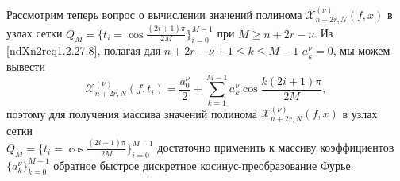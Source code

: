 Рассмотрим теперь вопрос о вычислении значений полинома $\mathcal{X}^{(\nu)}_{n+2r,N}(f,x)$ в узлах сетки $Q_M=\{t_i=\cos\frac{(2i+1)\pi}{2M}\}_{i=0}^{M-1}$ при  $M\ge n+2r-\nu$. Из \eqref{ndXn2req1.2.27.8}, полагая для $n+2r-\nu+1\le k\le M-1$  $a^\nu_k=0$,  мы можем вывести
\begin{equation}\label{ndXn2req1.2.27.17}
\mathcal{X}^{(\nu)}_{n+2r,N}(f,t_i)=\frac{a^\nu_0}{2}+\sum_{k=1}^{M-1}a^\nu_k\cos \frac{k(2i+1)\pi}{2M},
\end{equation}
поэтому для получения массива значений полинома  $\mathcal{X}^{(\nu)}_{n+2r,N}(f,x)$ в узлах сетки \\ $Q_M=\{t_i=\cos\frac{(2i+1)\pi}{2M}\}_{i=0}^{M-1}$ достаточно применить к массиву коэффициентов  $\{a^\nu_k\}_{k=0}^{M-1}$ обратное быстрое дискретное косинус-преобразование Фурье.

